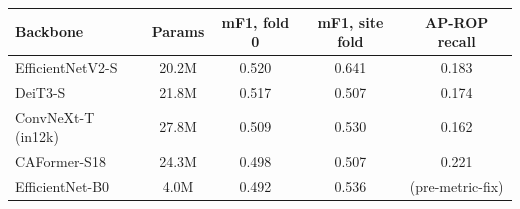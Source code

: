 \begin{tabular}{@{}lcccc@{}}
\toprule
Backbone & Params & mF1, fold 0 & mF1, site fold & AP-ROP recall\\
\midrule
EfficientNetV2-S & 20.2M & 0.520 & 0.641 & 0.183 \\
DeiT3-S & 21.8M & 0.517 & 0.507 & 0.174 \\
ConvNeXt-T (in12k) & 27.8M & 0.509 & 0.530 & 0.162 \\
CAFormer-S18 & 24.3M & 0.498 & 0.507 & 0.221 \\
EfficientNet-B0 & 4.0M & 0.492 & 0.536 & (pre-metric-fix) \\
\bottomrule
\end{tabular}
